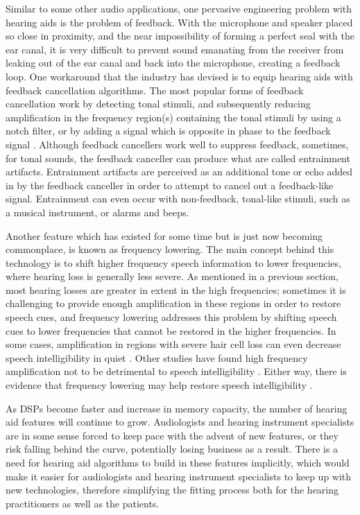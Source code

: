 Similar to some other audio applications, one pervasive engineering problem with hearing aids is the problem of feedback.  With the microphone and speaker placed so close in proximity, and the near impossibility of forming a perfect seal with the ear canal, it is very difficult to prevent sound emanating from the receiver from leaking out of the ear canal and back into the microphone, creating a feedback loop.  One workaround that the industry has devised is to equip hearing aids with feedback cancellation algorithms.  The most popular forms of feedback cancellation work by detecting tonal stimuli, and subsequently reducing amplification in the frequency region(s) containing the tonal stimuli by using a notch filter, or by adding a signal which is opposite in phase to the feedback signal \cite{Parsa2006}.  Although feedback cancellers work well to suppress feedback, sometimes, for tonal sounds, the feedback canceller can produce what are called entrainment artifacts.  Entrainment artifacts are perceived as an additional tone or echo added in by the feedback canceller in order to attempt to cancel out a feedback-like signal.  Entrainment can even occur with non-feedback, tonal-like stimuli, such as a musical instrument, or alarms and beeps.

Another feature which has existed for some time but is just now becoming commonplace, is known as frequency lowering.  The main concept behind this technology is to shift higher frequency speech information to lower frequencies, where hearing loss is generally less severe.  As mentioned in a previous section, most hearing losses are greater in extent in the high frequencies; sometimes it is challenging to provide enough amplification in these regions in order to restore speech cues, and frequency lowering addresses this problem by shifting speech cues to lower frequencies that cannot be restored in the higher frequencies.  In some cases, amplification in regions with severe hair cell loss can even decrease speech intelligibility in quiet \cite{Vickers2001}.  Other studies have found high frequency amplification not to be detrimental to speech intelligibility \cite{Cox2012}.  Either way, there is evidence that frequency lowering may help restore speech intelligibility \cite{Simpson2005, Glista2009}.

As DSPs become faster and increase in memory capacity, the number of hearing aid features will continue to grow.  Audiologists and hearing instrument specialists are in some sense forced to keep pace with the advent of new features, or they risk falling behind the curve, potentially losing business as a result.  There is a need for hearing aid algorithms to build in these features implicitly, which would make it easier for audiologists and hearing instrument specialists to keep up with new technologies, therefore simplifying the fitting process both for the hearing practitioners as well as the patients.

